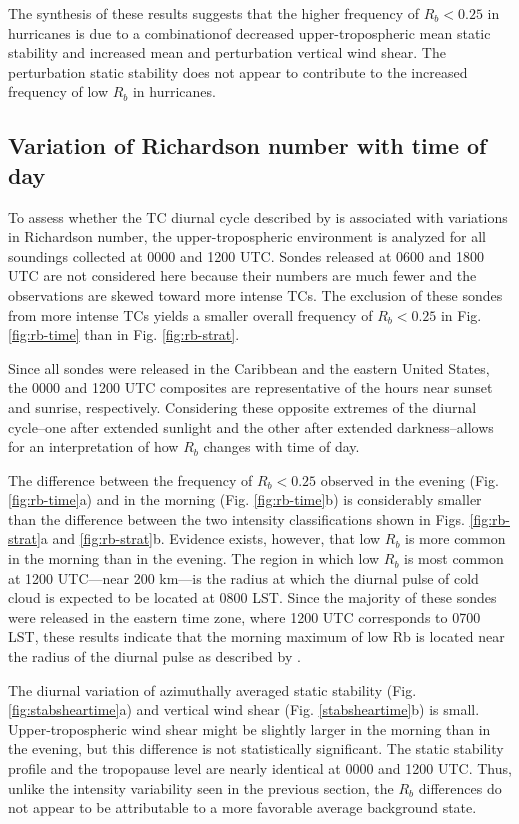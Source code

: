 The synthesis of these results suggests that the higher frequency of $R_b < 0.25$ in hurricanes is due to a combinationof decreased upper-tropospheric mean static stability and increased mean and perturbation vertical wind shear.
The perturbation static stability does not appear to contribute to the increased frequency of low $R_b$ in hurricanes.

\subsection{Variation of Richardson number with time of day}

To assess whether the TC diurnal cycle described by \cite{Dunionetal2014} is associated with variations in Richardson number, the upper-tropospheric environment is analyzed for all soundings collected at 0000 and 1200 UTC.
Sondes released at 0600 and 1800 UTC are not considered here because their numbers are much fewer and the observations are skewed toward more intense TCs.
The exclusion of these sondes from more intense TCs yields a smaller overall frequency of $R_b < 0.25$ in Fig. \ref{fig:rb-time} than in Fig. \ref{fig:rb-strat}.

Since all sondes were released in the Caribbean and the eastern United States, the 0000 and 1200 UTC composites are representative of the hours near sunset and sunrise, respectively.
Considering these opposite extremes of the diurnal cycle--one after extended sunlight and the other after extended darkness--allows for an interpretation of how $R_b$ changes with time of day.

The difference between the frequency of $R_b < 0.25$ observed in the evening (Fig. \ref{fig:rb-time}a) and in the morning (Fig. \ref{fig:rb-time}b) is considerably smaller than the difference between the two intensity classifications shown in Figs. \ref{fig:rb-strat}a and \ref{fig:rb-strat}b.
Evidence exists, however, that low $R_b$ is more common in the morning than in the evening.
The region in which low $R_b$ is most common at 1200 UTC---near 200 km---is the radius at which the diurnal pulse of cold cloud is expected to be located at 0800 LST.
Since the majority of these sondes were released in the eastern time zone, where 1200 UTC corresponds to 0700 LST, these results indicate that the morning maximum of low Rb is located near the radius of the diurnal pulse as described by \cite{Dunionetal2014}.

The diurnal variation of azimuthally averaged static stability (Fig. \ref{fig:stabsheartime}a) and vertical wind shear (Fig. \ref{stabsheartime}b) is small.
Upper-tropospheric wind shear might be slightly larger in the morning than in the evening, but this difference is not statistically significant.
The static stability profile and the tropopause level are nearly identical at 0000 and 1200 UTC.
Thus, unlike the intensity variability seen in the previous section, the $R_b$ differences do not appear to be attributable to a more favorable average background state.

